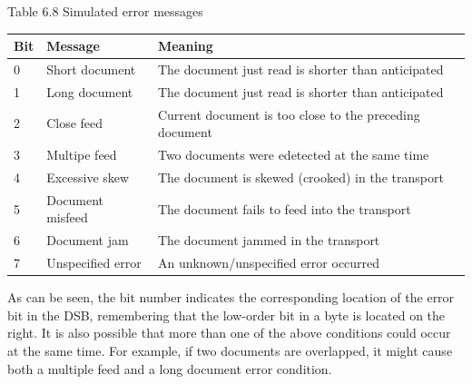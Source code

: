 \documentclass[10pt]{book}
\begin{document}
Table 6.8 Simulated error messages

\begin{center}
\begin{tabular}{|lll|}
\hline
Bit & Message & Meaning \\
\hline
0 & Short document & The document just read is shorter than anticipated \\
1 & Long document & The document just read is shorter than anticipated \\
2 & Close feed & Current document is too close to the preceding document \\
3 & Multipe feed & Two documents were edetected at the same time \\
4 & Excessive skew & The document is skewed (crooked) in the transport \\
5 & Document misfeed & The document fails to feed into the transport \\
6 & Document jam & The document jammed in the transport \\
7 & Unspecified error & An unknown/unspecified error occurred \\
\hline
\end{tabular}
\end{center}

As can be seen, the bit number indicates the corresponding location of the error bit in the DSB, remembering that the low-order bit in a byte is located on the right. It is also possible that more than one of the above conditions could occur at the same time. For example, if two documents are overlapped, it might cause both a multiple feed and a long document error condition.
\end{document}
